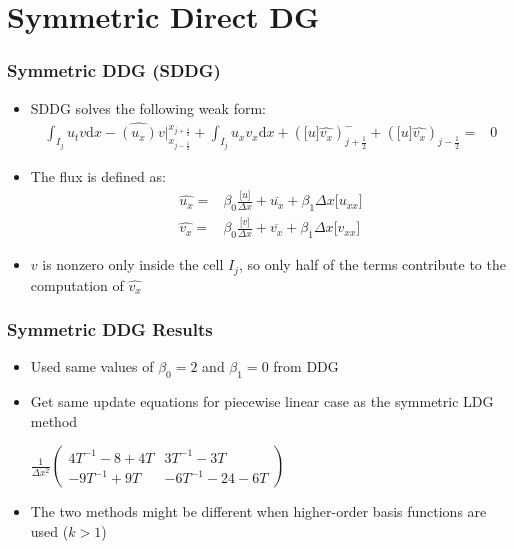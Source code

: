 \documentclass[serif,12pt]{beamer}
\begin{document}
\section{Symmetric Direct DG}
\begin{frame}
  \frametitle{Symmetric DDG (SDDG)}
  \begin{itemize}
  \item SDDG solves the following weak form:
    \begin{align*}
      \int_{I_j} u_t v \mathrm{d}x -\widehat{(u_x)}v\bigr|_{x_{j-\frac{1}{2}}}^{x_{j+\frac{1}{2}}}+\int_{I_j} u_x v_x \mathrm{d}x+ (\lbrack u\rbrack\widehat{v_x})_{j+\frac{1}{2}}^- + (\lbrack u\rbrack \widehat{v_x} )_{j-\frac{1}{2}} = & 0
    \end{align*}
  \item The flux is defined as:
    \begin{align*}
      \widehat{u_x} = & \beta_0 \frac{\lbrack u \rbrack}{\Delta x} + \overline{u_x} + \beta_1 \Delta x \lbrack u_{xx} \rbrack\\
      \widehat{v_x} = & \beta_0 \frac{\lbrack v \rbrack}{\Delta x} + \overline{v_x} + \beta_1 \Delta x \lbrack v_{xx} \rbrack
    \end{align*}
  \item $v$ is nonzero only inside the cell $I_j$, so only half of the terms contribute to the computation of $\widehat{v_x}$
  \end{itemize}
\end{frame}

\begin{frame}
  \frametitle{Symmetric DDG Results}
  \begin{itemize}
  \item Used same values of $\beta_0=2$ and $\beta_1=0$ from DDG
  \item Get same update equations for piecewise linear case as the symmetric LDG method\\
    \begin{center}
      $\frac{1}{\Delta x^2}\left(
        \begin{array}{cc}
          4T^{-1} -8+4 T & 3T^{-1}-3 T \\
          -9 T^{-1} +9 T & -6 T^{-1} -24-6 T
        \end{array}
      \right)$
    \end{center}
  \item The two methods might be different when higher-order basis functions are used ($k>1$)
  \end{itemize}
\end{frame}
\end{document}
